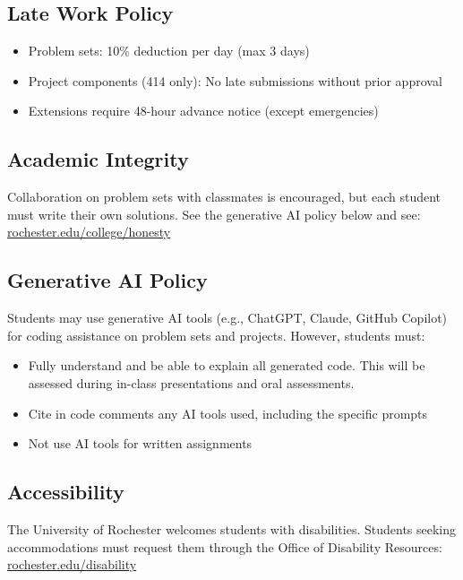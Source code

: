 \documentclass[11pt,letterpaper]{article}
\begin{document}
\subsection{Late Work Policy}

\begin{itemize}[leftmargin=*]
    \item Problem sets: 10\% deduction per day (max 3 days)
    \item Project components (414 only): No late submissions without prior approval
    \item Extensions require 48-hour advance notice (except emergencies)
\end{itemize}

\subsection{Academic Integrity}

Collaboration on problem sets with classmates is encouraged, but each student must write their own solutions. See the generative AI policy below and see: \href{http://www.rochester.edu/college/honesty/}{rochester.edu/college/honesty}

\subsection{Generative AI Policy}

Students may use generative AI tools (e.g., ChatGPT, Claude, GitHub Copilot) for coding assistance on problem sets and projects. However, students must:
\begin{itemize}[leftmargin=*]
    \item Fully understand and be able to explain all generated code. This will be assessed during in-class presentations and oral assessments.
    \item Cite in code comments any AI tools used, including the specific prompts
    \item Not use AI tools for written assignments
\end{itemize}

\subsection{Accessibility}

The University of Rochester welcomes students with disabilities. Students seeking accommodations must request them through the Office of Disability Resources: \href{https://www.rochester.edu/disability/}{rochester.edu/disability}
\end{document}
